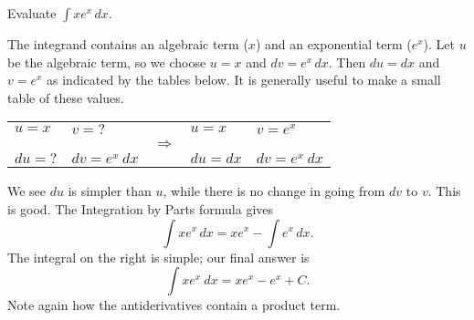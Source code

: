 \begin{example} \label{eg:5.1.2} %
Evaluate $\displaystyle \int x e^x\,dx$.

\solution
The integrand contains an algebraic term ($x$) and an exponential term ($e^x$). Let $u$ be the algebraic term, so we choose $u=x$ and $dv=e^x\,dx$.  Then $du=dx$ and $v=e^x$ as indicated by the tables below. It is generally useful to make a small table of these values.

\begin{tabular}{llcll} \\
$u= x$ & $v=\text{?}$ & & $u= x$ & $v=e^x$ \\
 && $\Rightarrow$ && \\
$du= \text{?}$ & $dv=e^x\ dx$ & &  $du= dx$ & $dv=e^x\ dx$ \\
\end{tabular}

\vspace{.25cm}

We see $du$ is simpler than $u$, while there is no change in going from $dv$ to $v$.  This is good.  The Integration by Parts formula gives
$$\int x e^x\,dx = xe^x - \int e^x\,dx.$$
The integral on the right is simple; our final answer is
$$\int xe^x\ dx = xe^x - e^x + C.$$
Note again how the antiderivatives contain a product term.
\end{example}